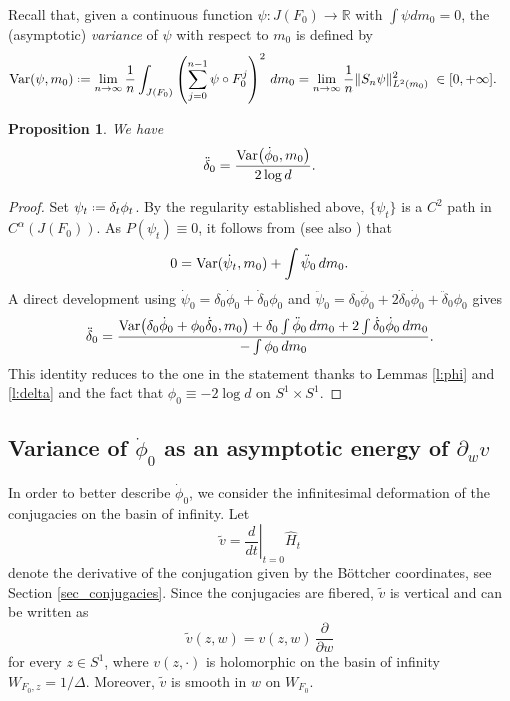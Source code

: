 \documentclass[11pt]{amsart}
\theoremstyle{plain}
\newtheorem{prop}[thm]{Proposition}
\theoremstyle{definition}
\theoremstyle{remark}
\newcommand*{\defeq}{\mathrel{\vcenter{\baselineskip0.5ex \lineskiplimit0pt
			\hbox{\scriptsize.}\hbox{\scriptsize.}}}%
	=}
\begin{document}
  Recall that,
given 
a continuous function $\psi\colon J(F_0)\to\mathbb R$ 
with $\int \psi dm_0=0$,
the (asymptotic)
\emph{variance} of $\psi$ with respect to $m_0$
 is defined by
\begin{align*}\label{eq_def_var}
{\rm Var}(\psi,m_0)
&\defeq
\lim_{n\to\infty}\frac1n
\int_{J(F_0)}\left(\sum_{j=0}^{n-1}\psi\circ F_0^j\right)^2\,dm_0
=
\lim_{n\to\infty}\frac1n\|S_n\psi\|_{L^2(m_0)}^2
\;\in[0,+\infty].
\end{align*}


\begin{prop}\label{thm_delta_second_derivative}
We have
\[
\ddot \delta_0 
=
\frac{
{\rm Var}\bigl(\dot\phi_0,m_0\bigr)}{2\log d}.
\]
\end{prop}

\begin{proof}
Set $\psi_t\defeq\delta_t\phi_t$.
By the regularity established above, $\{\psi_t\}$ is a $C^2$ path 
in
$C^\alpha(J(F_0))$.
As $P(\psi_t)\equiv 0$, 
it follows from 
\cite[Theorem~2.2]{McMullen08}
(see also \cite{PP90}) that
\[
0 = 
{\rm Var}
(\dot \psi_t, m_0) 
+\int \ddot \psi_0\,dm_0.
\]
A direct development using $\dot\psi_0 = \delta_0 \dot \phi_0 + \dot \delta_0 \phi_0$
and $\ddot \psi_0 =  \delta_0 \ddot \phi_0 + 2\dot \delta_0 \dot \phi_0  + \ddot \delta_0 \phi_0$
gives
\[
\ddot\delta_0
=
\frac{
{\rm Var}\bigl(\delta_0\dot\phi_0+\phi_0\dot\delta_0,m_0\bigr)
+\delta_0\int \ddot\phi_0\,dm_0
+2\int \dot\delta_0\dot\phi_0\,dm_0
}{
-\int\phi_0\,dm_0
}.
\]
This identity reduces to the one in the statement thanks to Lemmas
 \ref{l:phi} and  \ref{l:delta} and the fact that $\phi_0 \equiv -2\log d$ on $S^1\times S^1$.
\end{proof}




\subsection{Variance of $\dot \phi_0$ as an asymptotic energy of $\partial_w v$}\label{sec_CM2}





In order to
 better describe 
$\dot\phi_0$, we consider the infinitesimal
deformation of the conjugacies on the basin of infinity.
Let
\[
\widetilde v=\left.\frac{d}{dt}\right|_{t=0}\hat H_t
\]
denote the derivative of the conjugation
 given by
the B\"ottcher coordinates, see Section \ref{sec_conjugacies}.
Since the conjugacies are fibered, $\widetilde v$ is vertical and can be written as
\begin{equation}\label{eq:v}
\widetilde v(z,w)=v(z,w)\,\frac{\partial}{\partial w}
\end{equation}
for every $z\in S^1$,
where $v(z,\cdot)$ is holomorphic on the basin of infinity $W_{F_0,z}=1/\Delta$. 
Moreover, $\widetilde v$ is smooth in $w$
on $W_{F_0}$.
\end{document}
